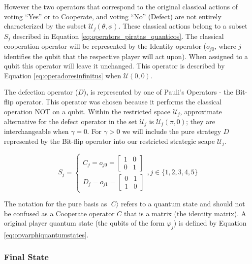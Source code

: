 \documentclass[10pt,twocolumn]{llncs}
\begin{document}
 However the two operators that correspond to the original classical actions of voting ``Yes'' or to Cooperate, and voting ``No'' (Defect) are not entirely characterized by the subset $\mathcal{U}_{j}(\theta, \phi)$. These classical actions belong to a subset $S_{j}$ described in Equation \ref{eq:operators_piratas_quanticos}.  
The classical cooperation operator will be represented by the Identity operator ($o_{j0}$, where $j$ identifies the qubit that the respective player will act upon). When assigned to a qubit this operator will leave it unchanged. This operator is described by Equation \ref{eq:operadoresinfinitus} when $\mathcal{U}(0,0)$.

The defection operator ($D$), is represented by one of Pauli's Operators - the Bit-flip operator. This operator was chosen because it performs the classical operation NOT on a qubit. 
Within the restricted space $\mathcal{U}_{j}$, approximate alternative for the defect operator in the set $\mathcal{U}_{j}$ is $\mathcal{U}_{j}(\pi, 0)$; they are interchangeable when $\gamma = 0$. For $\gamma >0$ we will include the pure strategy $D$ represented by the Bit-flip operator into our restricted strategic scape $\mathcal{U}_{j}$.



\begin{equation}
S_{j} = \begin{cases}
C_{j} = o_{j0}=\left[\begin{array}{cc}
1 & 0\\
0 & 1
\end{array}\right]\\
D_{j} = o_{j1}=\left[\begin{array}{cc}
0 & 1\\
1 & 0
\end{array}\right]
\end{cases} , j \in \{ 1, 2, 3, 4, 5 \}
\label{eq:operators_piratas_quanticos}
\end{equation}






The notation for the pure basis as $\vert C\rangle$ refers to a quantum state and should not be confused as a Cooperate operator $C$ that is a matrix (the identity matrix). A original player quantum state (the qubits of the form $\varphi_{j}$) is defined by Equation \ref{eq:opvarphiquantumstates}.





\subsubsection{Final State}
\label{subsec:pirates_finalstate}
\end{document}

